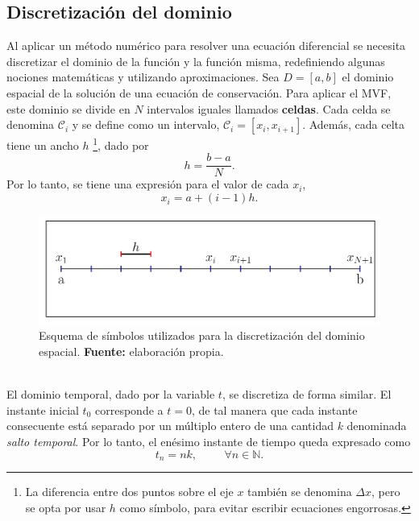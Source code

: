 \subsection{Discretización del dominio}
\label{sec:discretizacion-del-dominio}
Al aplicar un método numérico para resolver una ecuación diferencial se necesita discretizar el dominio de la función y la función misma, redefiniendo algunas nociones matemáticas y utilizando aproximaciones. Sea  $D = [a,b]$ el dominio espacial de la solución de una ecuación de conservación. Para aplicar el MVF, este dominio se divide en $N$ intervalos iguales llamados \textbf{celdas}. Cada celda se denomina $\mathcal{C}_i$ y se define como un intervalo, $\mathcal{C}_i = [x_i, x_{i+1}]$. Además, cada celta tiene un ancho $h$ \footnote{La diferencia entre dos puntos sobre el eje $x$ también se denomina $\Delta x$, pero se opta por usar $h$ como símbolo, para evitar escribir ecuaciones engorrosas.}, dado por
\begin{equation}
	h = \frac{b-a}{N}.
	\label{eq:def-h}
\end{equation}
Por lo tanto, se tiene una expresión para el valor de cada $x_i$,
\begin{equation}
	x_i = a + (i-1)h.
\end{equation}
\begin{figure}[ht]
	\centering
	\includegraphics[width=\linewidth]{../some_plots/cap2/graficas/domain.pdf}
	\caption{Esquema de símbolos utilizados para la discretización del dominio espacial. \textbf{Fuente:} elaboración propia.}
	\label{fig:discretizacion-eje-x}
\end{figure}\\
El dominio temporal, dado por la variable $t$, se discretiza de forma similar. El instante inicial $t_0$ corresponde a $t=0$, de tal manera que cada instante consecuente está separado por un múltiplo entero de una cantidad $k$ denominada \textit{salto temporal}. Por lo tanto, el enésimo instante de tiempo queda expresado como
\begin{equation}
	t_n = nk, \hspace{1cm} \forall n \in \mathbb{N}.
\end{equation}
